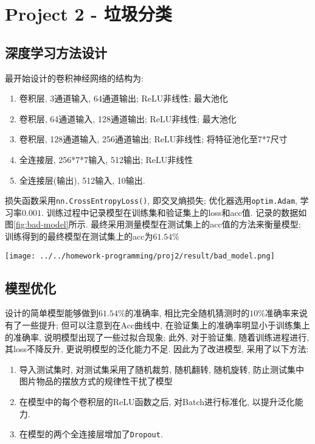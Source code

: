 \section{Project 2 - 垃圾分类}

\subsection{深度学习方法设计}


最开始设计的卷积神经网络的结构为:

\begin{enumerate}
    \item 卷积层, 3通道输入, 64通道输出; ReLU非线性; 最大池化
    \item 卷积层, 64通道输入, 128通道输出; ReLU非线性; 最大池化
    \item 卷积层, 128通道输入, 256通道输出; ReLU非线性; 将特征池化至7*7尺寸
    \item 全连接层, 256*7*7输入, 512输出; ReLU非线性
    \item 全连接层(输出), 512输入, 10输出.
\end{enumerate}

损失函数采用\verb|nn.CrossEntropyLoss()|, 即交叉熵损失; 优化器选用\verb|optim.Adam|, 学习率$0.001$. 训练过程中记录模型在训练集和验证集上的loss和acc值. 记录的数据如图\ref{fig:bad-model}所示. 最终采用测量模型在测试集上的acc值的方法来衡量模型; 训练得到的最终模型在测试集上的acc为$61.54\%$

\begin{figure*}[htbp]
    \centering
    \texttt{[image: ../../homework-programming/proj2/result/bad\_model.png]}
    \caption{简单模型的Loss和Acc值随训练进程变化}\label{fig:bad-model}
\end{figure*}

\subsection{模型优化}

设计的简单模型能够做到$61.54\%$的准确率, 相比完全随机猜测时的$10\%$准确率来说有了一些提升; 但可以注意到在Acc曲线中, 在验证集上的准确率明显小于训练集上的准确率, 说明模型出现了一些过拟合现象; 此外, 对于验证集, 随着训练进程进行, 其loss不降反升, 更说明模型的泛化能力不足. 因此为了改进模型, 采用了以下方法:

\begin{enumerate}
    \item 导入测试集时, 对测试集采用了随机裁剪, 随机翻转, 随机旋转, 防止测试集中图片物品的摆放方式的规律性干扰了模型
    \item 在模型中的每个卷积层的ReLU函数之后, 对Batch进行标准化, 以提升泛化能力.
    \item 在模型的两个全连接层增加了\verb|Dropout|.
\end{enumerate}

